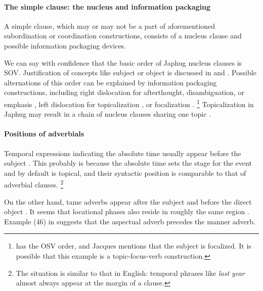 \documentclass[a4paper, oneside, 12pt]{report}
\newcommand*{\citesec}[1]{\S~{#1}}
\newcommand*{\citepage}[1]{p.~{#1}}
\newcommand*{\citepages}[1]{pp.~{#1}}
\newcommand{\form}[1]{\emph{#1}}
\begin{document}
\paragraph*{The simple clause: the nucleus and information packaging}
\label{sec:grammatical.clause.template.nucleus-identification}
A simple clause, which may or may not be a part 
of aforementioned subordination or coordination constructions,
consists of a nucleus clause and possible information packaging devices.

We can say with confidence that the basic order of Japhug nucleus clauses is SOV.
Justification of concepts like subject or object is discussed in 
 and .
Possible alternations of this order can be explained by information packaging constructions,
including right dislocation for afterthought, disambiguation, or emphasis 
\citep[\citesec{22.1.3}]{jacques2021grammar},
left dislocation for topicalization 
\citep[\citepage{1189}]{jacques2021grammar},
or focalization \citep[\citepage{1190}]{jacques2021grammar}.%
\footnote{
    \citep[\citepage{1190}]{jacques2021grammar} has the OSV order,
    and Jacques mentions that the subject is focalized.
    It is possible that this example is a topic-focus-verb construction.
}
Topicalization in Japhug may result in a chain of nucleus clauses sharing one topic
\citep[\citepage{1190}, (11)]{jacques2021grammar}.

\paragraph*{Positions of adverbials}\label{sec:grammatical.clause.template.adverb}
Temporal expressions indicating the absolute time usually appear before the subject
\citep[\citepage{344}, (167); \citepage{283}, (123)]{jacques2021grammar}.
This probably is because the absolute time sets the stage for the event
and by default is topical,
and their syntactic position is comparable to that of adverbial clauses.%
\footnote{
    The situation is similar to that in English:
    temporal phrases like \form{last year} almost always appear at the margin of a clause.
}

On the other hand, \ac{tame} adverbs
appear after the subject and before the direct object
\citep[\citepages{1200-1201,1210}]{jacques2021grammar}.
It seems that locational phases also reside in roughly the same region
\citep[\citepage{302}]{jacques2021grammar}.
Example (46) in \citet[\citepage{1200}]{jacques2021grammar}
suggests that the aspectual adverb precedes the manner adverb.
\end{document}
